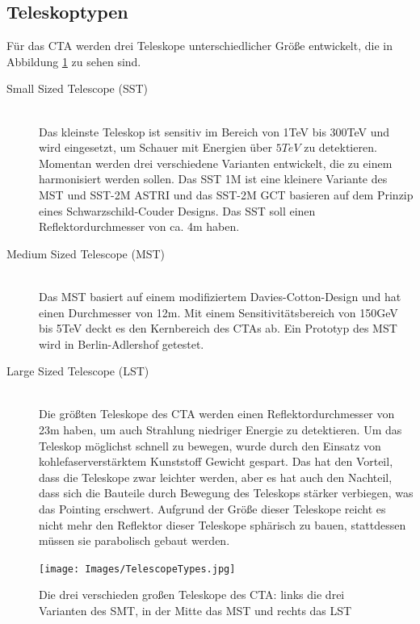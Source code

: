 \subsection{Teleskoptypen}
Für das CTA werden drei Teleskope unterschiedlicher Größe entwickelt, die in Abbildung \ref{img:TelescopeTypes} zu sehen sind.
\begin{description}
\item[Small Sized Telescope (SST)]\hfill \\
Das kleinste Teleskop ist sensitiv im Bereich von 1TeV bis 300TeV und wird eingesetzt, um Schauer mit Energien über $5\unit{TeV}$ zu detektieren. Momentan werden drei verschiedene Varianten entwickelt, die zu einem harmonisiert werden sollen. Das SST 1M ist eine kleinere Variante des MST und SST-2M  ASTRI und das SST-2M GCT basieren auf dem Prinzip eines Schwarzschild-Couder Designs. Das SST soll einen Reflektordurchmesser von ca. 4m haben.
\item[Medium Sized Telescope (MST)]\hfill \\ 
Das MST basiert auf einem modifiziertem Davies-Cotton-Design und hat einen Durchmesser von 12m. Mit einem Sensitivitätsbereich von 150GeV bis 5TeV deckt es den Kernbereich des CTAs ab. Ein Prototyp des MST wird in Berlin-Adlershof getestet.
\item[Large Sized Telescope (LST)]\hfill \\
Die größten Teleskope des CTA werden einen Reflektordurchmesser von 23m haben, um auch Strahlung niedriger Energie zu detektieren. Um das Teleskop möglichst schnell zu bewegen, wurde durch den Einsatz von kohlefaserverstärktem Kunststoff Gewicht gespart. Das hat den Vorteil, dass die Teleskope zwar leichter werden, aber es hat auch den Nachteil, dass sich die Bauteile durch Bewegung des Teleskops stärker verbiegen, was das Pointing erschwert. Aufgrund der Größe dieser Teleskope reicht es nicht mehr den Reflektor dieser Teleskope sphärisch zu bauen, stattdessen müssen sie parabolisch gebaut werden.%
\end{description}
\begin{figure}[htbp]
\centering
\texttt{[image: Images/TelescopeTypes.jpg]}
\caption{Die drei verschieden großen Teleskope des CTA: links die drei Varianten des SMT, in der Mitte das MST und rechts das LST \cite{Flickr}}
\label{img:TelescopeTypes}
\end{figure}

